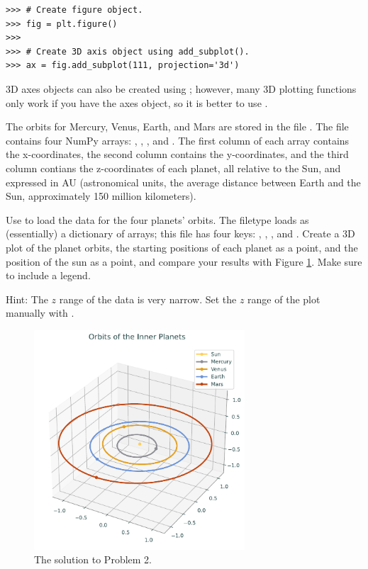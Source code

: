 \begin{lstlisting}
>>> # Create figure object.
>>> fig = plt.figure()
>>>
>>> # Create 3D axis object using add_subplot().
>>> ax = fig.add_subplot(111, projection='3d')
\end{lstlisting}

3D axes objects can also be created using ; however, many 3D plotting functions only work if you have the axes object, so it is better to use .

\begin{problem}
The orbits for Mercury, Venus, Earth, and Mars are stored in the file .
The file contains four NumPy arrays: , , , and .
The first column of each array contains the x-coordinates, the second column contains the y-coordinates, and the third column contians the z-coordinates of each planet, all relative to the Sun, and expressed in AU (astronomical units, the average distance between Earth and the Sun, approximately 150 million kilometers).

Use  to load the data for the four planets' orbits.
The  filetype loads as (essentially) a dictionary of arrays; this file has four keys: , , , and .
Create a 3D plot of the planet orbits, the starting positions of each planet as a point, and the position of the sun as a point, and compare your results with Figure \ref{lab0:3dplot}.
Make sure to include a legend.

Hint: The $z$ range of the data is very narrow. 
Set the $z$ range of the plot manually with .
\end{problem}

\begin{figure}[h]
\centering
\includegraphics[width=0.7\textwidth]{figures/orbits.pdf}
\caption{The solution to Problem 2.}
\label{lab0:3dplot}
\end{figure}

